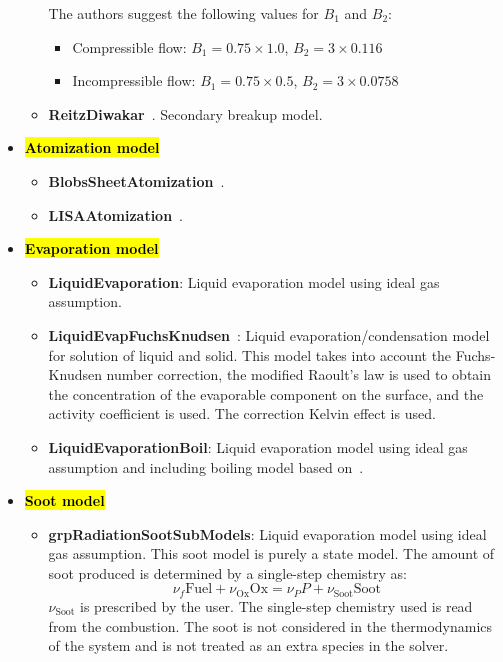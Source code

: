 \documentclass[12pt]{article}
\begin{document}
\begin{itemize}
\begin{itemize}
        The authors suggest the following values for $B_1$ and $B_2$:
        \begin{itemize}
            \item Compressible flow: $B_1 = 0.75 \times 1.0$, $B_2 = 3 \times 0.116$
            \item Incompressible flow: $B_1 = 0.75 \times 0.5$, $B_2 = 3 \times 0.0758$
        \end{itemize}
        \item \textbf{ReitzDiwakar}~\cite{reitz1987modeling,reitz1986effect,reitz1987structure}. Secondary breakup model.
    \end{itemize}
%
    \item \textbf{\hl{Atomization model}}
        \begin{itemize}
            \item \textbf{BlobsSheetAtomization}~\cite{han1997modeling,allocca2002experimental}.%
            \item \textbf{LISAAtomization}~\cite{senecal1999modeling,schmidt1999pressure}.%
        \end{itemize}
%
    \item \textbf{\hl{Evaporation model}}%
    \begin{itemize}
        \item \textbf{LiquidEvaporation}: Liquid evaporation model using ideal gas assumption.
        \item \textbf{LiquidEvapFuchsKnudsen}~\cite{chen2017numerical}: Liquid evaporation/condensation model for solution of liquid and solid. This model takes into account the Fuchs-Knudsen number correction, the modified Raoult's law is used to obtain the concentration of the evaporable component on the surface, and the activity coefficient is used. The correction Kelvin effect is used.
        \item \textbf{LiquidEvaporationBoil}: Liquid evaporation model using ideal gas assumption and including boiling model based on~\cite{zuo2000studies}.
    \end{itemize}
%
   \item \textbf{\hl{Soot model}}
    \begin{itemize}
        \item \textbf{grpRadiationSootSubModels}: Liquid evaporation model using ideal gas assumption.
         This soot model is purely a state model. The amount of soot produced is determined by a single-step chemistry as:
        \[
            \nu_f \text{Fuel} + \nu_{\text{Ox}} \text{Ox} = \nu_P P + \nu_{\text{Soot}} \text{Soot}
        \]
        $\nu_{\text{Soot}}$ is prescribed by the user. The single-step chemistry used is read from the combustion. The soot is not considered in the thermodynamics of the system and is not treated as an extra species in the solver.
        

\end{itemize}
\end{itemize}
\end{document}
